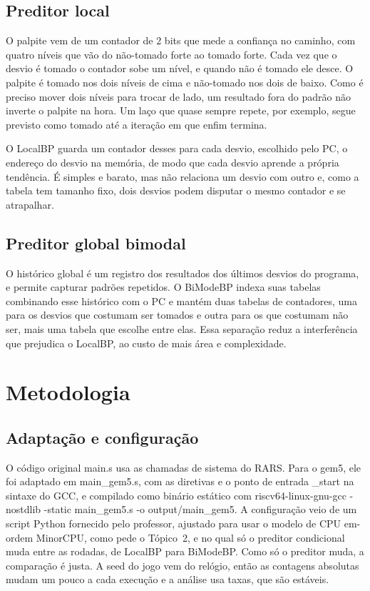 \documentclass[12pt]{article}
\begin{document}
\subsection{Preditor local}

O palpite vem de um contador de 2 bits que mede a confiança no caminho, com
quatro níveis que vão do não-tomado forte ao tomado forte. Cada vez que o
desvio é tomado o contador sobe um nível, e quando não é tomado ele desce. O
palpite é tomado nos dois níveis de cima e não-tomado nos dois de baixo.
Como é preciso mover dois níveis para trocar de lado, um resultado fora do
padrão não inverte o palpite na hora. Um laço que quase sempre repete, por
exemplo, segue previsto como tomado até a iteração em que enfim termina.

O LocalBP \cite{smith1981branch} guarda um contador desses para cada desvio,
escolhido pelo PC, o endereço do desvio na memória, de modo que cada desvio
aprende a própria tendência. É simples e barato, mas não relaciona um desvio
com outro e, como a tabela tem tamanho fixo, dois desvios podem disputar o
mesmo contador e se atrapalhar.

\subsection{Preditor global bimodal}

O histórico global é um registro dos resultados dos últimos desvios do
programa, e permite capturar padrões repetidos. O BiModeBP
\cite{lee1997bimode} indexa suas tabelas combinando esse histórico com o PC e
mantém duas tabelas de contadores, uma para os desvios que costumam ser
tomados e outra para os que costumam não ser, mais uma tabela que escolhe
entre elas. Essa separação reduz a interferência que prejudica o LocalBP, ao
custo de mais área e complexidade.

\section{Metodologia}

\subsection{Adaptação e configuração}

O código original main.s usa as chamadas de sistema do RARS. Para o gem5,
ele foi adaptado em main\_gem5.s, com as diretivas e o ponto de entrada
\_start na sintaxe do GCC, e compilado como binário estático com
{\ttfamily\small riscv64-linux-gnu-gcc -nostdlib -static main\_gem5.s -o
output/main\_gem5}. A configuração veio de um script Python fornecido pelo
professor, ajustado para usar o modelo de CPU em-ordem MinorCPU, como pede o
Tópico~2, e no qual só o preditor condicional muda entre as rodadas, de
LocalBP para BiModeBP. Como só o preditor muda, a comparação é justa. A seed
do jogo vem do relógio, então as contagens absolutas mudam um pouco a cada
execução e a análise usa taxas, que são estáveis.
\end{document}
